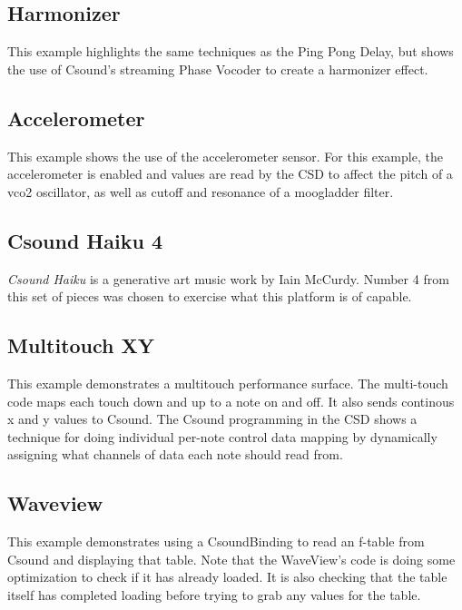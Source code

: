 \documentclass[11pt]{article}
\begin{document}
\subsection{Harmonizer}

This example highlights the same techniques as the Ping Pong Delay, but shows the use of Csound's streaming Phase Vocoder to create a harmonizer effect. 

\subsection{Accelerometer}

This example shows the use of the accelerometer sensor.  For this example, the accelerometer is enabled and values are read by the CSD to affect the pitch of a vco2 oscillator, as well as cutoff and resonance of a moogladder filter. 

\subsection{Csound Haiku 4}

\emph{Csound Haiku} is a generative art music work by Iain McCurdy.  Number 4 from this set of pieces was chosen to exercise what this platform is of capable.

\subsection{Multitouch XY}

This example demonstrates a multitouch performance surface. The multi-touch code maps each touch down and up to a note on and off.  It also sends continous x and y values to Csound.  The Csound programming in the CSD shows a technique for doing individual per-note control data mapping by dynamically assigning what channels of data each note should read from. 

\subsection{Waveview}

This example demonstrates using a CsoundBinding to read an f-table from Csound and displaying that table.  Note that the WaveView's code is doing some optimization to check if it has already loaded.  It is also checking that the table itself has completed loading before trying to grab any values for the table. 
\end{document}
